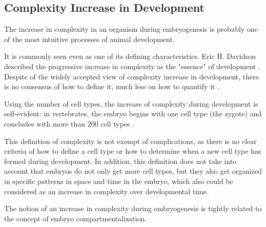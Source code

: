\subsection{Complexity Increase in Development}

The increase in complexity in an organism during embryogenesis is probably one of the most intuitive processes of animal development.

It is commonly seen even as one of its defining characteristics.
Eric H. Davidson described the progressive increase in complexity as the "essence" of development \citep{Davidson2001}. Despite of the widely accepted view of complexity increase in development, there is no consensus of how to define it, much less on how to quantify it \citep{susan2000ontogeny}.


Using the number of cell types, the increase of complexity during development is self-evident: in vertebrates, the embryo begins with one cell type (the zygote) and concludes with more than 200 cell types \citep{Alberts1994}. 


This definition of complexity is not exempt of complications, as there is no clear criteria of how to define a cell type or how to determine when a new cell type has formed during development. 
%
In addition, this definition does not take into account that embryos do not only get more cell types, but they also get organized in specific patterns in space and time in the embryo, which also could be considered as an increase in complexity over developmental time.

The notion of an increase in complexity during embryogenesis is tightly related to the concept of embryo compartmentalization.

